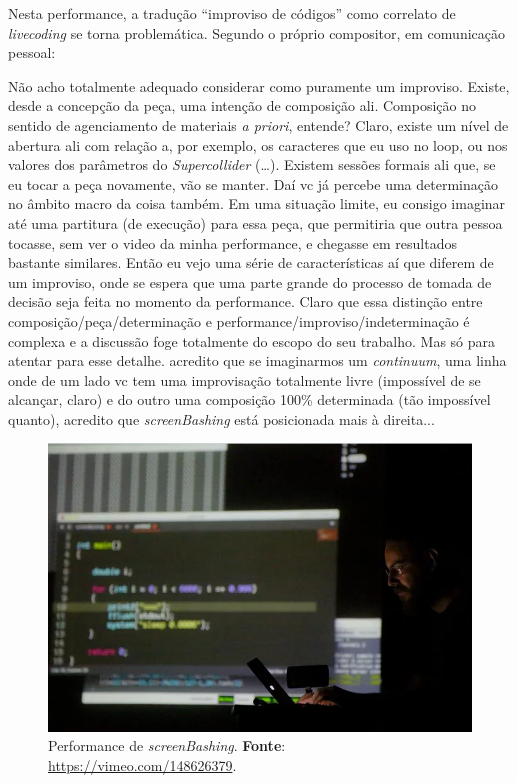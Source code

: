 Nesta performance, a tradução ``improviso de códigos'' como correlato de \emph{livecoding}  se torna problemática. Segundo o próprio compositor, em comunicação pessoal:

\begin{citacao}
Não acho totalmente adequado considerar como puramente um improviso. Existe, desde a concepção da peça, uma intenção de composição ali. Composição no sentido de agenciamento de materiais \emph{a priori}, entende? Claro, existe um nível de abertura ali com relação a, por exemplo, os caracteres que eu uso no loop, ou nos valores dos parâmetros do \emph{Supercollider} (\ldots). Existem sessões formais ali que, se eu tocar a peça novamente, vão se manter. Daí vc já percebe uma determinação no âmbito macro da coisa também. Em uma situação limite, eu consigo imaginar até uma partitura (de execução) para essa peça, que permitiria que outra pessoa tocasse, sem ver o video da minha performance, e chegasse em resultados bastante similares. Então eu vejo uma série de características aí que diferem de um improviso, onde se espera que uma parte grande do processo de tomada de decisão seja feita no momento da performance. Claro que essa distinção entre composição/peça/determinação e performance/improviso/indeterminação é complexa e a discussão foge totalmente do escopo do seu trabalho. Mas só para atentar para esse detalhe. acredito que se imaginarmos um \emph{continuum}, uma linha onde de um lado vc tem uma improvisação totalmente livre (impossível de se alcançar, claro) e do outro uma composição 100\% determinada (tão impossível quanto), acredito que \emph{screenBashing} está posicionada mais à direita...
\end{citacao}

\begin{figure}[!h]
  \centering
  \includegraphics[scale=0.5]{imagens/screenbashing.png}
  \caption{Performance de \emph{screenBashing}. \textbf{Fonte}: \url{https://vimeo.com/148626379}.}
  \label{fig:screenbashing}
\end{figure}

